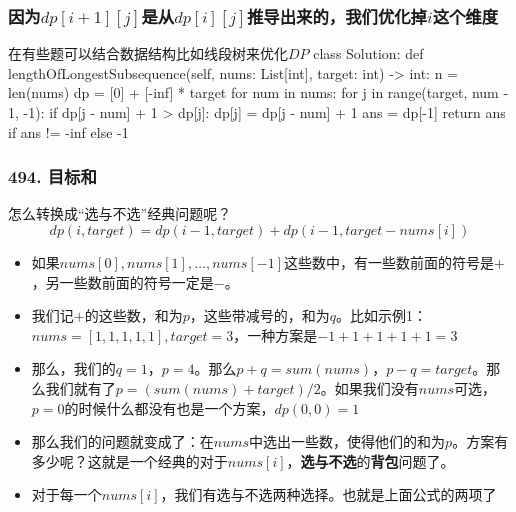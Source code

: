 \begin{frame}[fragile]          %
  \frametitle{因为$dp[i+1][j]$是从$dp[i][j]$推导出来的，我们优化掉$i$这个维度}
  \begin{codeblock}[language=python]{在有些题可以结合数据结构比如线段树来优化$DP$}
class Solution:
    def lengthOfLongestSubsequence(self, nums: List[int], target: int) -> int:
        n = len(nums)
        dp = [0] + [-inf] * target
        for num in nums:
            for j in range(target, num - 1, -1):
                if dp[j - num] + 1 > dp[j]:
                    dp[j] = dp[j - num] + 1
        ans = dp[-1]
        return ans if ans != -inf else -1
  \end{codeblock}
\end{frame}


\begin{frame}[fragile]          %
  \frametitle{\textsc{494. 目标和}}
  \begin{alertblock}{怎么转换成“选与不选”经典问题呢？}
    \begin{equation*}
      dp(i,target)=dp(i-1,target)+dp(i-1,target-nums[i])
    \end{equation*}
  \end{alertblock}
  \begin{itemize}
    \item 如果$nums[0],nums[1],\dots,nums[-1]$这些数中，有一些数前面的符号是$+$，另一些数前面的符号一定是$-$。
    \item 我们记$+$的这些数，和为$p$，这些带减号的，和为$q$。比如示例1：$nums=[1,1,1,1,1],target=3$，一种方案是$-1+1+1+1+1=3$
    \item 那么，我们的$q=1$，$p=4$。那么$p+q=sum(nums)$，$p-q=target$。那么我们就有了$p=(sum(nums)+target)/2$。如果我们没有$nums$可选，$p=0$的时候什么都没有也是一个方案，$dp(0,0)=1$
    \item 那么我们的问题就变成了：在$nums$中选出一些数，使得他们的和为$p$。方案有多少呢？这就是一个经典的对于$nums[i]$，\textbf{选与不选}的\textbf{背包}问题了。
    \item 对于每一个$nums[i]$，我们有选与不选两种选择。也就是上面公式的两项了
  \end{itemize}
\end{frame}



